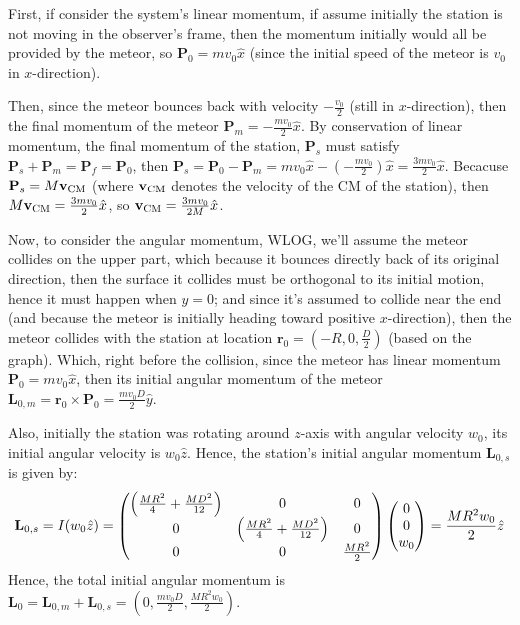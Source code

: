 \documentclass{article}
\DeclarePairedDelimiter{\paran}{(}{)}%
\newcommand{\br}{\textbf{r}} %
\newcommand{\bv}{\textbf{v}} %
\newcommand{\bP}{\textbf{P}} %
\newcommand{\bL}{\textbf{L}} %
\begin{document}
First, if consider the system's linear momentum, if assume initially the station is not moving in the observer's frame, then the momentum initially would all be provided by the meteor, so $\bP_0 = mv_0\hat{x}$ (since the initial speed of the meteor is $v_0$ in $x$-direction).

Then, since the meteor bounces back with velocity $-\frac{v_0}{2}$ (still in $x$-direction), then the final momentum of the meteor $\bP_m = -\frac{mv_0}{2}\hat{x}$. By conservation of linear momentum, the final momentum of the station, $\bP_s$ must satisfy $\bP_s + \bP_m = \bP_f = \bP_0$, then $\bP_s = \bP_0-\bP_m = mv_0\hat{x}-(-\frac{mv_0}{2})\hat{x} = \frac{3mv_0}{2}\hat{x}$. Becacuse $\bP_s= M\bv_{\textmd{CM}}$ (where $\bv_{\textmd{CM}}$ denotes the velocity of the CM of the station), then $M\bv_{\textmd{CM}} = \frac{3mv_0}{2}\hat{x}$, so $\bv_{\textmd{CM}} = \frac{3mv_0}{2M}\hat{x}$.

\hfil

Now, to consider the angular momentum, WLOG, we'll assume the meteor collides on the upper part, which because it bounces directly back of its original direction, then the surface it collides must be orthogonal to its initial motion, hence it must happen when $y=0$; and since it's assumed to collide near the end (and because the meteor is initially heading toward positive $x$-direction), then the meteor collides with the station at location $\br_0=(-R, 0, \frac{D}{2})$ (based on the graph). Which, right before the collision, since the meteor has linear momentum $\bP_0 = mv_0\hat{x}$, then its initial angular momentum of the meteor $\bL_{0,m} = \br_0\times \bP_0 = \frac{mv_0D}{2}\hat{y}$.

Also, initially the station was rotating around $z$-axis with angular velocity $w_0$, its initial angular velocity is $w_0\hat{z}$. Hence, the station's initial angular momentum $\bL_{0,s}$ is given by:
\begin{align}
    \bL_{0,s}=I(w_0\hat{z}) = \begin{pmatrix}
        \paran*{\frac{MR^2}{4}+\frac{MD^2}{12}}&0&0\\
        0&\paran*{\frac{MR^2}{4}+\frac{MD^2}{12}}&0\\
        0&0& \frac{MR^2}{2}
    \end{pmatrix}\begin{pmatrix}
        0\\0\\w_0
    \end{pmatrix} = \frac{MR^2w_0}{2}\hat{z}
\end{align}
Hence, the total initial angular momentum is $\bL_0 = \bL_{0,m}+\bL_{0,s} = (0,\frac{mv_0D}{2},\frac{MR^2w_0}{2})$.
\end{document}
